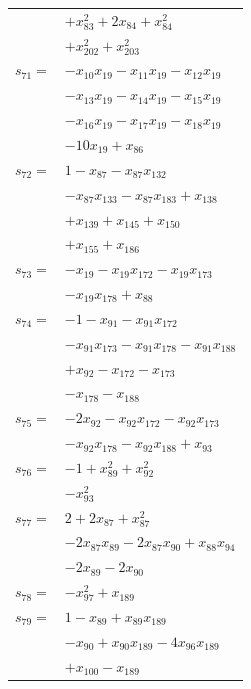 \begin{longtable}{@{}r@{\;}l@{}}
 & \(\displaystyle +x_{83}^{2} +2x_{84} +x_{84}^{2}\) \\
 & \(\displaystyle +x_{202}^{2} +x_{203}^{2}\) \\[3pt]
\(s_{71}=\) & \(\displaystyle -x_{10}x_{19} -x_{11}x_{19} -x_{12}x_{19}\) \\
 & \(\displaystyle -x_{13}x_{19} -x_{14}x_{19} -x_{15}x_{19}\) \\
 & \(\displaystyle -x_{16}x_{19} -x_{17}x_{19} -x_{18}x_{19}\) \\
 & \(\displaystyle -10x_{19} +x_{86}\) \\[3pt]
\(s_{72}=\) & \(\displaystyle 1 -x_{87} -x_{87}x_{132}\) \\
 & \(\displaystyle -x_{87}x_{133} -x_{87}x_{183} +x_{138}\) \\
 & \(\displaystyle +x_{139} +x_{145} +x_{150}\) \\
 & \(\displaystyle +x_{155} +x_{186}\) \\[3pt]
\(s_{73}=\) & \(\displaystyle -x_{19} -x_{19}x_{172} -x_{19}x_{173}\) \\
 & \(\displaystyle -x_{19}x_{178} +x_{88}\) \\[3pt]
\(s_{74}=\) & \(\displaystyle -1 -x_{91} -x_{91}x_{172}\) \\
 & \(\displaystyle -x_{91}x_{173} -x_{91}x_{178} -x_{91}x_{188}\) \\
 & \(\displaystyle +x_{92} -x_{172} -x_{173}\) \\
 & \(\displaystyle -x_{178} -x_{188}\) \\[3pt]
\(s_{75}=\) & \(\displaystyle -2x_{92} -x_{92}x_{172} -x_{92}x_{173}\) \\
 & \(\displaystyle -x_{92}x_{178} -x_{92}x_{188} +x_{93}\) \\[3pt]
\(s_{76}=\) & \(\displaystyle -1 +x_{89}^{2} +x_{92}^{2}\) \\
 & \(\displaystyle -x_{93}^{2}\) \\[3pt]
\(s_{77}=\) & \(\displaystyle 2 +2x_{87} +x_{87}^{2}\) \\
 & \(\displaystyle -2x_{87}x_{89} -2x_{87}x_{90} +x_{88}x_{94}\) \\
 & \(\displaystyle -2x_{89} -2x_{90}\) \\[3pt]
\(s_{78}=\) & \(\displaystyle -x_{97}^{2} +x_{189}\) \\[3pt]
\(s_{79}=\) & \(\displaystyle 1 -x_{89} +x_{89}x_{189}\) \\
 & \(\displaystyle -x_{90} +x_{90}x_{189} -4x_{96}x_{189}\) \\
 & \(\displaystyle +x_{100} -x_{189}\) \\[3pt]

\end{longtable}
